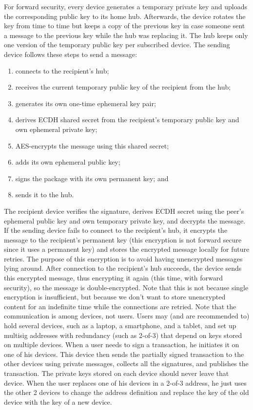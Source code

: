 \documentclass[a4paper, dvipdfmx]{jsarticle}
\begin{document}
For forward security, every device generates a temporary private key and uploads the corresponding public key to its home hub. Afterwards, the device rotates the key from time to time but keeps a copy of the previous key in case someone sent a message to the previous key while the hub was replacing it. The hub keeps only one version of the temporary public key per subscribed device. The sending device follows these steps to send a message:
\begin{enumerate}
    \item connects to the recipient’s hub;
    \item receives the current temporary public key of the recipient from the hub;
    \item generates its own one-time ephemeral key pair;
    \item derives ECDH shared secret from the recipient’s temporary public key and
    own ephemeral private key;
    \item AES-encrypts the message using this shared secret;
    \item adds its own ephemeral public key;
    \item signs the package with its own permanent key; and
    \item sends it to the hub.
\end{enumerate}
The recipient device verifies the signature, derives ECDH secret using the
peer’s ephemeral public key and own temporary private key, and decrypts the message.
If the sending device fails to connect to the recipient’s hub, it encrypts the message to the recipient’s permanent key (this encryption is not forward secure since it uses a permanent key) and stores the encrypted message locally for future retries. The purpose of this encryption is to avoid having unencrypted messages lying around. After connection to the recipient’s hub succeeds, the device sends this encrypted message, thus encrypting it again (this time, with forward security), so the message is double-encrypted. Note that this is not because single encryption is insufficient, but because we don’t want to store unencrypted content for an indefinite time while the connections are retried.
Note that the communication is among devices, not users. Users may (and are recommended to) hold several devices, such as a laptop, a smartphone, and a tablet, and set up multisig addresses with redundancy (such as 2-of-3) that depend on keys stored on multiple devices. When a user needs to sign a transaction, he initiates it on one of his devices. This device then sends the partially signed transaction to the other devices using private messages, collects all the signatures, and publishes the transaction. The private keys stored on each device should never leave that device. When the user replaces one of his devices in a 2-of-3 address, he just uses the other 2 devices to change the address definition and replace the key of the old device with the key of a new device.
\end{document}
